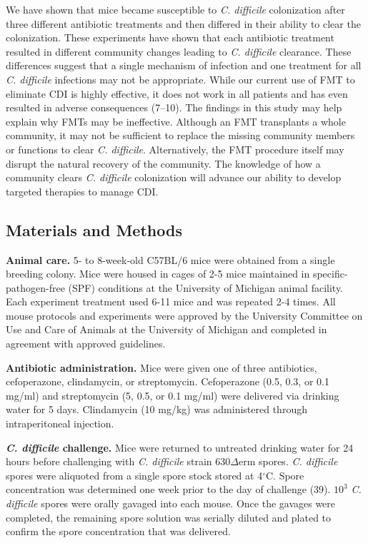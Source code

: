 \documentclass[11pt,]{article}
\begin{document}
We have shown that mice became susceptible to \emph{C. difficile}
colonization after three different antibiotic treatments and then
differed in their ability to clear the colonization. These experiments
have shown that each antibiotic treatment resulted in different
community changes leading to \emph{C. difficile} clearance. These
differences suggest that a single mechanism of infection and one
treatment for all \emph{C. difficile} infections may not be appropriate.
While our current use of FMT to eliminate CDI is highly effective, it
does not work in all patients and has even resulted in adverse
consequences (7--10). The findings in this study may help explain why
FMTs may be ineffective. Although an FMT transplants a whole community,
it may not be sufficient to replace the missing community members or
functions to clear \emph{C. difficile}. Alternatively, the FMT procedure
itself may disrupt the natural recovery of the community. The knowledge
of how a community clears \emph{C. difficile} colonization will advance
our ability to develop targeted therapies to manage CDI.

\hypertarget{materials-and-methods}{%
\subsection{Materials and Methods}\label{materials-and-methods}}

\textbf{Animal care.} 5- to 8-week-old C57BL/6 mice were obtained from a
single breeding colony. Mice were housed in cages of 2-5 mice maintained
in specific-pathogen-free (SPF) conditions at the University of Michigan
animal facility. Each experiment treatment used 6-11 mice and was
repeated 2-4 times. All mouse protocols and experiments were approved by
the University Committee on Use and Care of Animals at the University of
Michigan and completed in agreement with approved guidelines.

\textbf{Antibiotic administration.} Mice were given one of three
antibiotics, cefoperazone, clindamycin, or streptomycin. Cefoperazone
(0.5, 0.3, or 0.1 mg/ml) and streptomycin (5, 0.5, or 0.1 mg/ml) were
delivered via drinking water for 5 days. Clindamycin (10 mg/kg) was
administered through intraperitoneal injection.

\textbf{\emph{C. difficile} challenge.} Mice were returned to untreated
drinking water for 24 hours before challenging with \emph{C. difficile}
strain 630\(\Delta\)erm spores. \emph{C. difficile} spores were
aliquoted from a single spore stock stored at 4\(^\circ\)C. Spore
concentration was determined one week prior to the day of challenge
(39). \(10^{3}\) \emph{C. difficile} spores were orally gavaged into
each mouse. Once the gavages were completed, the remaining spore
solution was serially diluted and plated to confirm the spore
concentration that was delivered.
\end{document}
